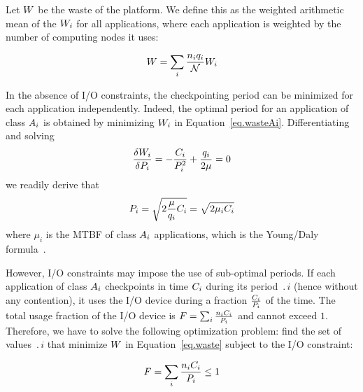 Let $W$ be the waste of the platform. We define this as the
weighted arithmetic mean of the $W_{i}$ for all applications,
where each application is weighted by the number of computing nodes
it uses:

\begin{equation}
W = \sum_i \frac{n_{i} q_{i}}{{\mathcal N}} W_{i}
\label{eq.waste}
\end{equation}

In the absence of I/O constraints, the checkpointing period can be minimized
for each application independently. Indeed, the optimal period for an application
of class $A_{i}$ is obtained by minimizing $W_{i}$ in Equation~\eqref{eq.wasteAi}.
Differentiating and solving
$$\frac{\delta W_{i}}{\delta P_{i}} = - \frac{C_{i}}{P_{i}^{2}} + \frac{q_{i}}{2 \mu} = 0$$
we readily derive that
\begin{equation}
P_{i} = \sqrt{2 \frac{\mu}{q_{i}} C_{i}} = \sqrt{2 \mu_{i} C_{i}}
\label{eq.daly}
\end{equation}
where $\mu_{i}$ is the MTBF of  class $A_{i}$ applications, which is the Young/Daly formula~\cite{young74,daly04}.

However, I/O constraints may impose the use of sub-optimal periods. If each application
of  class $A_{i}$ checkpoints in time $C_{i}$ during its period $\period{i}$ (hence without any contention), it uses the I/O device during a fraction $\frac{C_{i}}{P_{i}}$ of the time.
The total usage fraction of the  I/O device is $F = \sum_{i} \frac{n_{i} C_{i}}{P_{i}}$
and cannot exceed $1$. Therefore, we have to solve the following optimization problem: find
the set of values $\period{i}$ that minimize $W$ in Equation~\eqref{eq.waste} subject to the I/O constraint:

\begin{equation}
F = \sum_{i} \frac{n_{i} C_{i}}{P_{i}} \leq 1
\label{eq.IOconstraint}
\end{equation}

